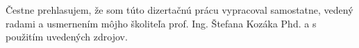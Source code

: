 Čestne prehlasujem, že som túto dizertačnú prácu vypracoval samostatne, vedený radami a usmernením môjho školiteľa prof. Ing. Štefana Kozáka Phd. a s použitím uvedených zdrojov.